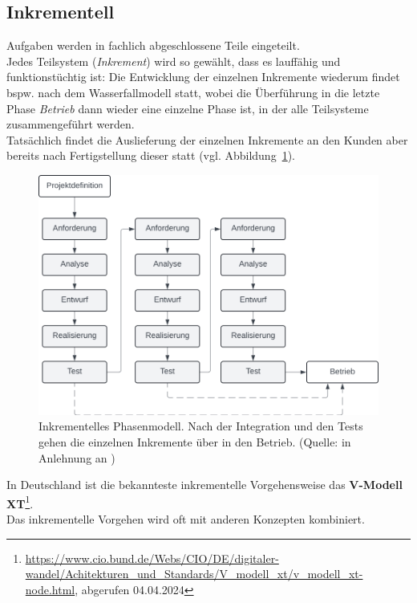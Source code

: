 
\subsection{Inkrementell}
Aufgaben werden in fachlich abgeschlossene Teile eingeteilt.\\
Jedes Teilsystem (\textit{Inkrement}) wird so gewählt, dass es lauffähig und funktionstüchtig ist: Die Entwicklung der einzelnen Inkremente wiederum findet bspw. nach dem Wasserfallmodell statt,
wobei die Überführung in die letzte Phase \textit{Betrieb} dann wieder eine einzelne Phase ist, in der alle Teilsysteme zusammengeführt werden.\\
Tatsächlich findet die Auslieferung der einzelnen Inkremente an den Kunden aber bereits nach Fertigstellung dieser statt (vgl. Abbildung~\ref{fig:inkrementell}).\\

\begin{figure}
    \centering
    \includegraphics[scale=0.4]{chapters/Prozessmodelle/img/inkrementell}
    \caption{Inkrementelles Phasenmodell.
    Nach der Integration und den Tests gehen die einzelnen Inkremente über in den Betrieb.
        (Quelle: in Anlehnung an \cite[322]{AABG14n})}
    \label{fig:inkrementell}
\end{figure}

\noindent
In Deutschland ist die bekannteste inkrementelle Vorgehensweise das \textbf{V-Modell XT}\footnote{
\url{https://www.cio.bund.de/Webs/CIO/DE/digitaler-wandel/Achitekturen_und_Standards/V_modell_xt/v_modell_xt-node.html}, abgerufen 04.04.2024
}.\\
Das inkrementelle Vorgehen wird oft mit anderen Konzepten kombiniert.

